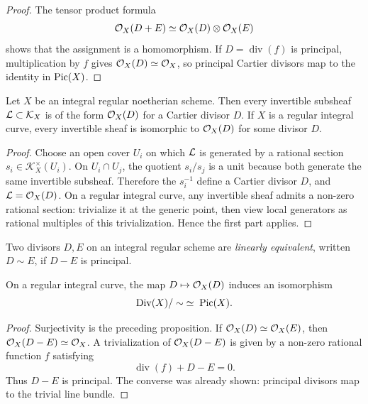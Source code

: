 \begin{proof}
The tensor product formula
\[
    \mathcal{O}_X(D+E)\simeq\mathcal{O}_X(D)\otimes\mathcal{O}_X(E)
\]
shows that the assignment is a homomorphism.  If \(D=\operatorname{div}(f)\) is
principal, multiplication by \(f\) gives \(\mathcal{O}_X(D)\simeq\mathcal{O}_X\), so principal
Cartier divisors map to the identity in \(\operatorname{Pic}(X)\).
\end{proof}

\begin{proposition}
Let \(X\) be an integral regular noetherian scheme.  Then every invertible
subsheaf \(\mathcal{L}\subset\mathcal K_X\) is of the form \(\mathcal{O}_X(D)\) for a Cartier
divisor \(D\).  If \(X\) is a regular integral curve, every invertible sheaf is
isomorphic to \(\mathcal{O}_X(D)\) for some divisor \(D\).
\end{proposition}

\begin{proof}
Choose an open cover \(U_i\) on which \(\mathcal{L}\) is generated by a rational
section \(s_i\in\mathcal K_X^\times(U_i)\).  On \(U_i\cap U_j\), the quotient
\(s_i/s_j\) is a unit because both generate the same invertible subsheaf.
Therefore the \(s_i^{-1}\) define a Cartier divisor \(D\), and
\(\mathcal{L}=\mathcal{O}_X(D)\).  On a regular integral curve, any invertible sheaf admits a
non-zero rational section: trivialize it at the generic point, then view local
generators as rational multiples of this trivialization.  Hence the first part
applies.
\end{proof}

\begin{definition}
Two divisors \(D,E\) on an integral regular scheme are \emph{linearly
equivalent}, written \(D\sim E\), if \(D-E\) is principal.
\end{definition}

\begin{corollary}
On a regular integral curve, the map \(D\mapsto\mathcal{O}_X(D)\) induces an
isomorphism
\[
    \operatorname{Div}(X)/\sim \;\simeq\; \operatorname{Pic}(X).
\]
\end{corollary}

\begin{proof}
Surjectivity is the preceding proposition.  If \(\mathcal{O}_X(D)\simeq\mathcal{O}_X(E)\), then
\(\mathcal{O}_X(D-E)\simeq\mathcal{O}_X\).  A trivialization of \(\mathcal{O}_X(D-E)\) is given by a
non-zero rational function \(f\) satisfying
\[
    \operatorname{div}(f)+D-E=0.
\]
Thus \(D-E\) is principal.  The converse was already shown: principal divisors
map to the trivial line bundle.
\end{proof}

